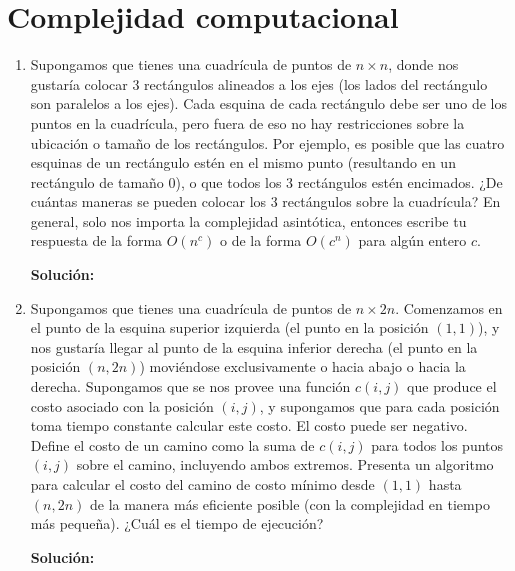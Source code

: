 \documentclass[11pt,letterpaper]{article}
\newenvironment{solution}{%
  \noindent\begin{shaded}
  \textbf{Solución:}\ }{
  \end{shaded}%
}
\begin{document}
\section*{Complejidad computacional}

\begin{enumerate}
\item%
  Supongamos que tienes una cuadrícula de puntos de \(n \times n\),
  donde nos gustaría colocar \(3\) rectángulos alineados a los ejes
  (los lados del rectángulo son paralelos a los ejes).  Cada esquina
  de cada rectángulo debe ser uno de los puntos en la cuadrícula, pero
  fuera de eso no hay restricciones sobre la ubicación o tamaño de los
  rectángulos.  Por ejemplo, es posible que las cuatro esquinas de un
  rectángulo estén en el mismo punto (resultando en un rectángulo de
  tamaño \(0\)), o que todos los \(3\) rectángulos estén encimados.
  ¿De cuántas maneras se pueden colocar los \(3\) rectángulos sobre la
  cuadrícula?  En general, solo nos importa la complejidad asintótica,
  entonces escribe tu respuesta de la forma \(O(n^c)\) o de la forma
  \(O(c^n)\) para algún entero \(c\).
  \begin{solution}
  \end{solution}
\item%
  Supongamos que tienes una cuadrícula de puntos de \(n \times 2n\).
  Comenzamos en el punto de la esquina superior izquierda (el punto en
  la posición \((1,1)\)), y nos gustaría llegar al punto de la esquina
  inferior derecha (el punto en la posición \((n, 2n)\)) moviéndose
  exclusivamente o hacia abajo o hacia la derecha.  Supongamos que se
  nos provee una función \(c(i,j)\) que produce el costo asociado con
  la posición \((i,j)\), y supongamos que para cada posición toma
  tiempo constante calcular este costo.  El costo puede ser negativo.
  Define el costo de un camino como la suma de \(c(i,j)\) para todos
  los puntos \((i,j)\) sobre el camino, incluyendo ambos extremos.
  Presenta un algoritmo para calcular el costo del camino de costo
  mínimo desde \((1,1)\) hasta \((n,2n)\) de la manera más eficiente
  posible (con la complejidad en tiempo más pequeña).  ¿Cuál es el
  tiempo de ejecución?
  \begin{solution}
  \end{solution}
\end{enumerate}


\end{document}
